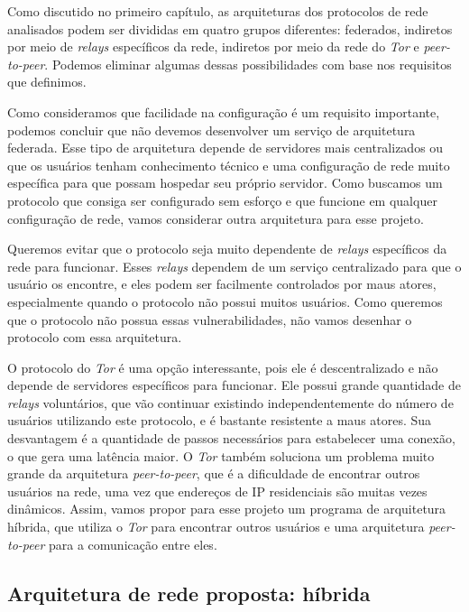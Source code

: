 Como discutido no primeiro capítulo, as arquiteturas dos protocolos de rede analisados podem ser divididas em quatro grupos diferentes: federados, indiretos por meio de \textit{relays} específicos da rede, indiretos por meio da rede do \textit{Tor} e \textit{peer-to-peer}. Podemos eliminar algumas dessas possibilidades com base nos requisitos que definimos.

Como consideramos que facilidade na configuração é um requisito importante, podemos concluir que não devemos desenvolver um serviço de arquitetura federada. Esse tipo de arquitetura depende de servidores mais centralizados ou que os usuários tenham conhecimento técnico e uma configuração de rede muito específica para que possam hospedar seu próprio servidor. Como buscamos um protocolo que consiga ser configurado sem esforço e que funcione em qualquer configuração de rede, vamos considerar outra arquitetura para esse projeto.

Queremos evitar que o protocolo seja muito dependente de \textit{relays} específicos da rede para funcionar. Esses \textit{relays} dependem de um serviço centralizado para que o usuário os encontre, e eles podem ser facilmente controlados por maus atores, especialmente quando o protocolo não possui muitos usuários. Como queremos que o protocolo não possua essas vulnerabilidades, não vamos desenhar o protocolo com essa arquitetura.

O protocolo do \textit{Tor} é uma opção interessante, pois ele é descentralizado e não depende de servidores específicos para funcionar. Ele possui grande quantidade de \textit{relays} voluntários, que vão continuar existindo independentemente do número de usuários utilizando este protocolo, e é bastante resistente a maus atores. Sua desvantagem é a quantidade de passos necessários para estabelecer uma conexão, o que gera uma latência maior. O \textit{Tor} também soluciona um problema muito grande da arquitetura \textit{peer-to-peer}, que é a dificuldade de encontrar outros usuários na rede, uma vez que endereços de IP residenciais são muitas vezes dinâmicos. Assim, vamos propor para esse projeto um programa de arquitetura híbrida, que utiliza o \textit{Tor} para encontrar outros usuários e uma arquitetura \textit{peer-to-peer} para a comunicação entre eles.

\subsection{Arquitetura de rede proposta: híbrida}

